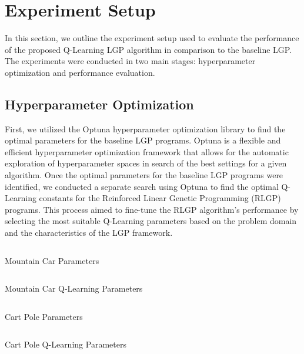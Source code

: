 \documentclass[12pt, final]{dalcsthesis}
\begin{document}
\section{Experiment Setup}

In this section, we outline the experiment setup used to evaluate the performance of the proposed Q-Learning LGP algorithm in comparison to the baseline LGP. The experiments were conducted in two main stages: hyperparameter optimization and performance evaluation.

\subsection{Hyperparameter Optimization}

First, we utilized the Optuna hyperparameter optimization library \cite{akiba2019optuna} to find the optimal parameters for the baseline LGP programs.
Optuna is a flexible and efficient hyperparameter optimization framework that allows for the automatic exploration of hyperparameter spaces in search of the best settings for a given algorithm.
Once the optimal parameters for the baseline LGP programs were identified, we conducted a separate search using Optuna to find the optimal Q-Learning constants for the Reinforced Linear Genetic Programming (RLGP) programs.
This process aimed to fine-tune the RLGP algorithm's performance by selecting the most suitable Q-Learning parameters based on the problem domain and the characteristics of the LGP framework.

\begin{listing}[hb]
	\centering
	\inputminted[breaklines]{json}{../assets/parameters/mountain-car-lgp.json}
	\caption{Mountain Car Parameters}
	\label{code:mountain-car-parameters}
\end{listing}

\begin{listing}[hb]
	\centering
	\inputminted[breaklines]{json}{../assets/parameters/mountain-car-q.json}
	\caption{Mountain Car Q-Learning Parameters}
	\label{code:mountain-car-q-parameters}
\end{listing}

\begin{listing}[hb]
	\centering
	\inputminted[breaklines]{json}{../assets/parameters/cart-pole-lgp.json}
	\caption{Cart Pole Parameters}
	\label{code:cart-pole-parameters}
\end{listing}

\begin{listing}[hb]
	\centering
	\inputminted[breaklines]{json}{../assets/parameters/cart-pole-q.json}
	\caption{Cart Pole Q-Learning Parameters}
	\label{code:cart-pole-q-parameters}
\end{listing}
\end{document}

